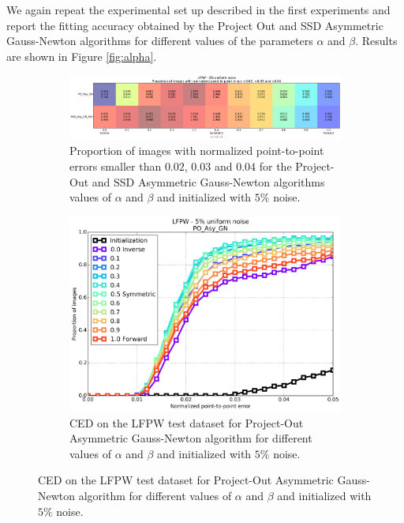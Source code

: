 We again repeat the experimental set up described in the first experiments and report the fitting accuracy obtained by the Project Out and SSD Asymmetric Gauss-Newton algorithms for different values of the parameters $\alpha$ and $\beta$. Results are shown in Figure \ref{fig:alpha}. 

\begin{figure}[h!]
	\centering
	\begin{subfigure}{\textwidth}
	    \includegraphics[width=\textwidth]{experiments/alpha/asy_gn_vs_alpha_5.png}
	    \caption{Proportion of images with normalized point-to-point errors smaller than $0.02$, $0.03$ and $0.04$ for the Project-Out and SSD Asymmetric Gauss-Newton algorithms values of $\alpha$ and $\beta$ and initialized with $5\%$ noise.}
	    \label{fig:ced_po_asy_gn}
	\end{subfigure}
	\par\bigskip
	\begin{subfigure}{0.48\textwidth}
	    \includegraphics[width=\textwidth]{experiments/alpha/ced_po_asy_gn_5.png}
	    \caption{CED on the LFPW test dataset for Project-Out Asymmetric Gauss-Newton algorithm for different values of $\alpha$ and $\beta$ and initialized with $5\%$ noise.}
	    \label{fig:ced_po_for_gn}
	\end{subfigure}
	\hfill

\end{figure}
